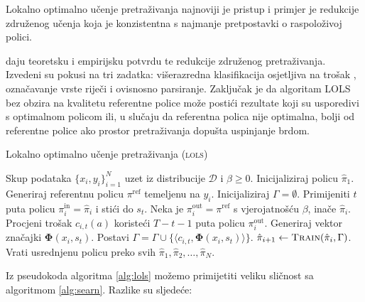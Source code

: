 Lokalno optimalno učenje pretraživanja 
najnoviji je pristup i primjer je redukcije združenog učenja koja je
konzistentna s najmanje pretpostavki o raspoloživoj polici.

\cite{daume15lols} daju teoretsku i empirijsku potvrdu te redukcije združenog
pretraživanja. Izvedeni su pokusi na tri zadatka: višerazredna klasifikacija
osjetljiva na trošak ,
označavanje vrste riječi i ovisnosno parsiranje. Zaključak je da algoritam
\textsc{LOLS} bez obzira na kvalitetu referentne police može postići rezultate
koji su usporedivi s optimalnom policom ili, u slučaju da referentna polica nije
optimalna, bolji od referentne police ako prostor pretraživanja dopušta
uspinjanje brdom.

\begin{algorithm}
\caption{Lokalno optimalno učenje pretraživanja (\textsc{lols})}\label{alg:lols}
\begin{algorithmic}[1]
\Require Skup podataka $\{x_i, y_i\}_{i=1}^N$ uzet iz distribucije $\mathcal{D}$
         i $\beta \geq 0$. %
\State Inicijaliziraj policu $\hat{\pi}_1$.
  \State Generiraj referentnu policu $\pi^{\text{ref}}$ temeljenu na $y_i$.
  \State Inicijaliziraj $\Gamma = \emptyset$. 
    \State Primijeniti $t$ puta policu $\pi_{i}^{\text{in}} = \hat{\pi}_i$  i stići do $s_t$.  \label{alg:lols:learned}
      \State Neka je  $\pi_{i}^{\text{out}} = \pi^{\text{ref}}$ s vjerojatnošću $\beta$, inače $\hat{\pi}_i$.
      \State Procjeni trošak $c_{i,t}(a)$ koristeći $T-t-1$ puta policu $\pi_{i}^{\text{out}}$.  \label{alg:lols:mixture}
    \EndFor
    \State Generiraj vektor značajki $\mathbf{\Phi}(x_i, s_t)$.
    \State Postavi $\Gamma = \Gamma \cup \{\langle c_{i,t}, \mathbf{\Phi}(x_i, s_t) \rangle\}$.
  \EndFor
  \State $\hat{\pi}_{i+1} \gets \textsc{Train}(\hat{\pi}_i, \Gamma)$.
\EndFor
\State Vrati usrednjenu policu preko svih $\hat{\pi}_1, \hat{\pi}_2, \ldots, \hat{\pi}_N$.
\end{algorithmic}
\end{algorithm}

Iz pseudokoda algoritma \ref{alg:lols} možemo primijetiti veliku sličnost sa
algoritmom \ref{alg:searn}. Razlike su sljedeće:

